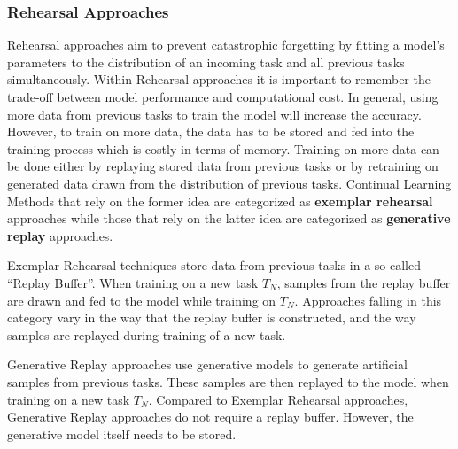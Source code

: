 \subsubsection{Rehearsal Approaches}
\label{sec:RehearsalApproaches}
Rehearsal approaches aim to prevent catastrophic forgetting by fitting a model's parameters to the distribution
of an incoming task and all previous tasks simultaneously. Within Rehearsal approaches it is important to remember the trade-off between
model performance and computational cost. In general, using more data from previous tasks to train the model will increase the accuracy. 
However, to train on more data, the data has to be stored and fed into the training process which is costly in terms of memory.
Training on more data can be done either by replaying stored data from previous tasks or by
retraining on generated data drawn from the distribution of previous tasks. Continual Learning Methods that rely on the former idea are
categorized as \textbf{exemplar rehearsal} approaches while those that rely on the latter idea are categorized as \textbf{generative replay}
approaches. \par
Exemplar Rehearsal techniques store data from previous tasks in a so-called \enquote{Replay Buffer}. When training on a new task $T_N$, samples
from the replay buffer are drawn and fed to the model while training on $T_N$. Approaches falling in this category vary in the way that the replay
buffer is constructed, and the way samples are replayed during training of a new task. \par
Generative Replay approaches use generative models to generate artificial samples from previous tasks. These samples are then replayed to
the model when training on a new task $T_N$. Compared to Exemplar Rehearsal approaches, Generative Replay approaches do not require a replay buffer.
However, the generative model itself needs to be stored. 

